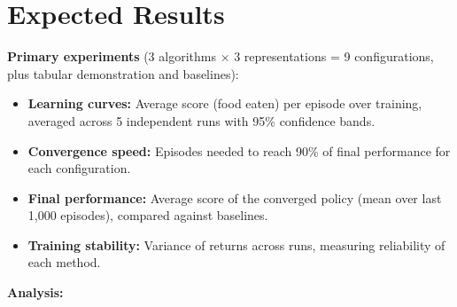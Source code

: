 \documentclass[11pt]{article}
\begin{document}
\section{Expected Results}

\textbf{Primary experiments} (3 algorithms $\times$ 3 representations = 9 configurations, plus tabular demonstration and baselines):

\begin{itemize}[nosep]
    \item \textbf{Learning curves:} Average score (food eaten) per episode over training, averaged across 5 independent runs with 95\% confidence bands.
    \item \textbf{Convergence speed:} Episodes needed to reach 90\% of final performance for each configuration.
    \item \textbf{Final performance:} Average score of the converged policy (mean over last 1,000 episodes), compared against baselines.
    \item \textbf{Training stability:} Variance of returns across runs, measuring reliability of each method.
\end{itemize}

\textbf{Analysis:}
\end{document}
